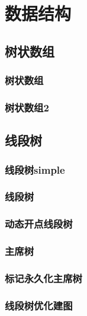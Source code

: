 \section{数据结构}
\subsection{树状数组}
\subsubsection{树状数组}


\subsubsection{树状数组2}


\subsection{线段树}
\subsubsection{线段树simple}

\subsubsection{线段树}


\subsubsection{动态开点线段树}

\subsubsection{主席树}


\subsubsection{标记永久化主席树}


\subsubsection{线段树优化建图}


